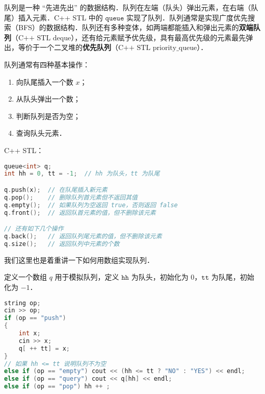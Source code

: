 
队列是一种 “先进先出” 的数据结构．队列在左端（队头）弹出元素，在右端（队尾）插入元素．C++ STL 中的 $\mathtt{queue}$ 实现了队列．队列通常是实现广度优先搜索（BFS）的数据结构．队列还有多种变体，如两端都能插入和弹出元素的\textbf{双端队列}（$\text{C++ STL deque}$），还有给元素赋予优先级，具有最高优先级的元素最先弹出，等价于一个二叉堆的\textbf{优先队列}（$\text{C++ STL priority_queue}$）．

队列通常有四种基本操作：

\begin{enumerate}
\item 向队尾插入一个数 $x$；
\item 从队头弹出一个数；
\item 判断队列是否为空；
\item 查询队头元素．
\end{enumerate}

C++ STL：

\begin{lstlisting}[language=cpp]
queue<int> q;
int hh = 0, tt = -1;  // hh 为队头，tt 为队尾

q.push(x);  // 在队尾插入新元素
q.pop();    // 删除队列首元素但不返回其值
q.empty();  // 如果队列为空返回 true，否则返回 false
q.front();  // 返回队首元素的值，但不删除该元素

// 还有如下几个操作
q.back();   // 返回队列尾元素的值，但不删除该元素
q.size();   // 返回队列中元素的个数

\end{lstlisting}

我们这里也是着重讲一下如何用数组实现队列．

定义一个数组 $q$ 用于模拟队列，定义 $\mathtt{hh}$ 为队头，初始化为 $0$，$\mathtt{tt}$ 为队尾，初始化为 $-1$．

\begin{lstlisting}[language=cpp]
string op;
cin >> op;
if (op == "push") 
{
    int x;
    cin >> x;
    q[ ++ tt] = x;
} 
// 如果 hh <= tt 说明队列不为空
else if (op == "empty") cout << (hh <= tt ? "NO" : "YES") << endl;
else if (op == "query") cout << q[hh] << endl;
else if (op == "pop") hh ++ ;
\end{lstlisting}